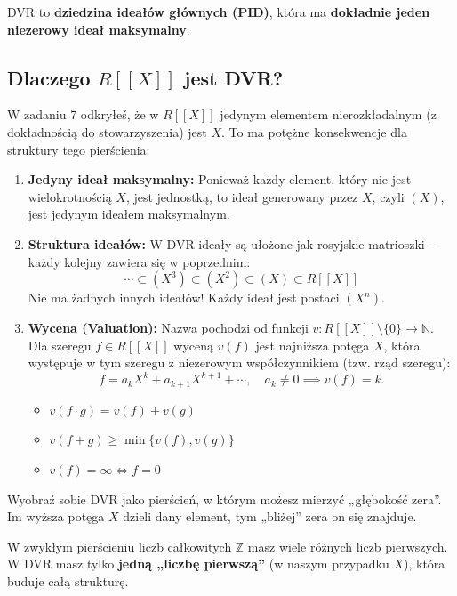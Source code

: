 \begin{definition}
DVR to \textbf{dziedzina ideałów głównych (PID)}, która ma \textbf{dokładnie jeden niezerowy ideał maksymalny}.
\end{definition}

\subsection*{Dlaczego \( R[[X]] \) jest DVR?}

W zadaniu 7 odkryłeś, że w \( R[[X]] \) jedynym elementem nierozkładalnym (z dokładnością do stowarzyszenia) jest \( X \). To ma potężne konsekwencje dla struktury tego pierścienia:

\begin{enumerate}[label=\arabic*)]
    \item \textbf{Jedyny ideał maksymalny:} Ponieważ każdy element, który nie jest wielokrotnością \( X \), jest jednostką, to ideał generowany przez \( X \), czyli \( (X) \), jest jedynym ideałem maksymalnym.
    
    \item \textbf{Struktura ideałów:} W DVR ideały są ułożone jak rosyjskie matrioszki – każdy kolejny zawiera się w poprzednim:
    \[
    \cdots \subset (X^3) \subset (X^2) \subset (X) \subset R[[X]]
    \]
    Nie ma żadnych innych ideałów! Każdy ideał jest postaci \( (X^n) \).
    
    \item \textbf{Wycena (Valuation):} Nazwa pochodzi od funkcji \( v: R[[X]] \setminus \{0\} \to \mathbb{N} \). Dla szeregu \( f \in R[[X]] \) wyceną \( v(f) \) jest najniższa potęga \( X \), która występuje w tym szeregu z niezerowym współczynnikiem (tzw. rząd szeregu):
    \[
    f = a_k X^k + a_{k+1} X^{k+1} + \cdots, \quad a_k \neq 0 \implies v(f) = k.
    \]
    \begin{itemize}
        \item \( v(f \cdot g) = v(f) + v(g) \)
        \item \( v(f + g) \geq \min\{v(f), v(g)\} \)
        \item \( v(f) = \infty \iff f = 0 \)
    \end{itemize}
\end{enumerate}

\begin{intuition}
Wyobraź sobie DVR jako pierścień, w którym możesz mierzyć „głębokość zera”. Im wyższa potęga \( X \) dzieli dany element, tym „bliżej” zera on się znajduje. 

W zwykłym pierścieniu liczb całkowitych \( \mathbb{Z} \) masz wiele różnych liczb pierwszych. W DVR masz tylko \textbf{jedną „liczbę pierwszą”} (w naszym przypadku \( X \)), która buduje całą strukturę.
\end{intuition} 

